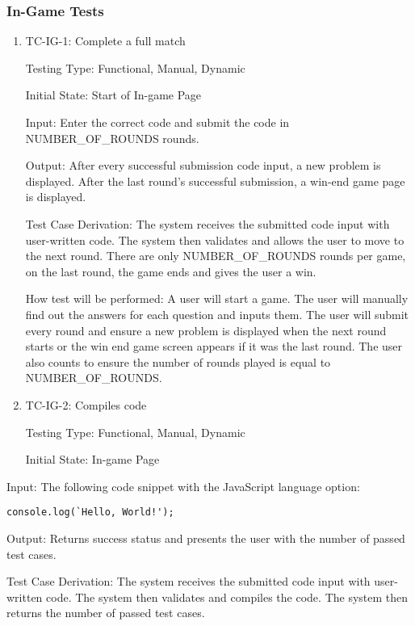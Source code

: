 \documentclass[12pt, titlepage]{article}
\begin{document}
\subsubsection{In-Game Tests}

\begin{enumerate}

\item{TC-IG-1: Complete a full match}

Testing Type: Functional, Manual, Dynamic
					
Initial State: Start of In-game Page
					
Input: Enter the correct code and submit the code in NUMBER\_OF\_ROUNDS rounds.
					
Output: After every successful submission code input, a new problem is displayed. After the last round's successful submission, a win-end game page is displayed.

Test Case Derivation: The system receives the submitted code input with user-written code. The system then validates and allows the user to move to the next round. There are only NUMBER\_OF\_ROUNDS rounds per game, on the last round, the game ends and gives the user a win.
					
How test will be performed: A user will start a game. The user will manually find out the answers for each question and inputs them. The user will submit every round and ensure a new problem is displayed when the next round starts or the win end game screen appears if it was the last round. The user also counts to ensure the number of rounds played is equal to NUMBER\_OF\_ROUNDS.

\item{TC-IG-2: Compiles code}

Testing Type: Functional, Manual, Dynamic
					
Initial State: In-game Page
					
\end{enumerate} 

Input: The following code snippet with the JavaScript language option:
\begin{verbatim}
console.log(`Hello, World!');
\end{verbatim}
					
Output: Returns success status and presents the user with the number of passed test cases.

Test Case Derivation: The system receives the submitted code input with user-written code. The system then validates and compiles the code. The system then returns the number of passed test cases.
					
\end{document}
